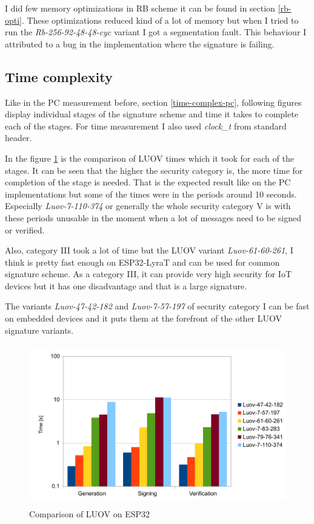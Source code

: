 \documentclass[thesis=M,english]{FITthesis}[2019/12/23]
\begin{document}
\bigskip
\noindent
I did few memory optimizations in RB scheme it can be found in section \ref{rb-opti}. These optimizations reduced kind of a lot of memory but when I tried to run the \textit{Rb-256-92-48-48-cyc} variant I got a segmentation fault. This behaviour I attributed to a bug in the implementation where the signature is failing.

\subsection{Time complexity}
Like in the PC measurement before, section \ref{time-complex-pc}, following figures display individual stages of the signature scheme and time it takes to complete each of the stages. For time measurement I also used \textit{clock\_t} from standard header.

\bigskip
\noindent
In the figure \ref{time-luov} is the comparison of LUOV times which it took for each of the stages. It can be seen that the higher the security category is, the more time for completion of the stage is needed. That is the expected result like on the PC implementations but some of the times were in the periods around 10 seconds. Especially \textit{Luov-7-110-374} or generally the whole security category V is with these periods unusable in the moment when a lot of messages need to be signed or verified.

\bigskip
\noindent
Also, category III took a lot of time but the LUOV variant \textit{Luov-61-60-261}, I think is pretty fast enough on ESP32-LyraT and can be used for common signature scheme. As a category III, it can provide very high security for IoT devices but it has one disadvantage and that is a large signature.

\bigskip
\noindent
The variants \textit{Luov-47-42-182} and \textit{Luov-7-57-197} of security category I can be fast on embedded devices and it puts them at the forefront of the other LUOV signature variants.

\bigskip
\begin{figure}[H]
\centering
\includegraphics[width=13cm,height=7cm]{images/time-luov.pdf}
\caption{Comparison of LUOV on ESP32}
\label{time-luov}
\end{figure}
\end{document}
